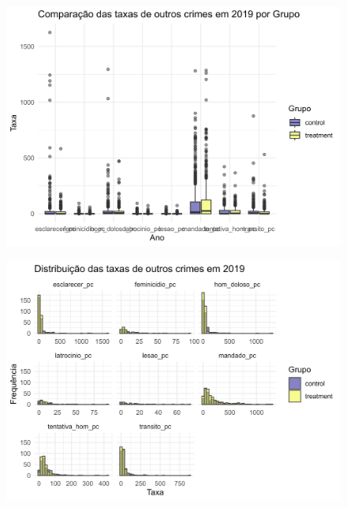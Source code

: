 \documentclass{beamer}
\begin{document}
\begin{frame}
	\begin{figure}
		\centering
		\includegraphics[width=1\linewidth]{figures/boxplot_outros}
		\label{fig:histoghom}
	\end{figure}
	
\end{frame}

\begin{frame}
	\begin{figure}
		\centering
		\includegraphics[width=1\linewidth]{figures/histog_outros_nonzero}
		\label{fig:histoghom}
	\end{figure}
	
\end{frame}
\end{document}

